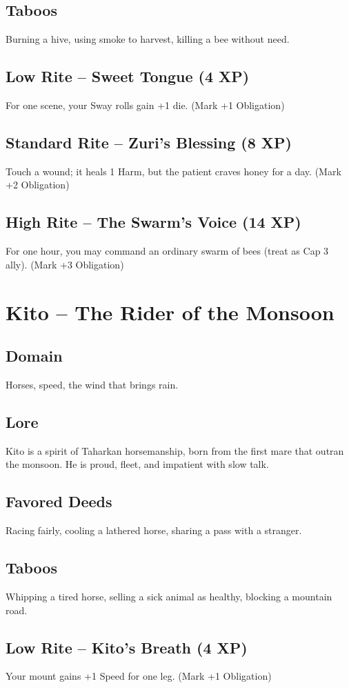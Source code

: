 \documentclass[11pt]{book}
\begin{document}
\subsection*{Taboos}
Burning a hive, using smoke to harvest, killing a bee without need.
\subsection*{Low Rite -- Sweet Tongue (4 XP)}
For one scene, your Sway rolls gain +1 die. (Mark +1 Obligation)
\subsection*{Standard Rite -- Zuri's Blessing (8 XP)}
Touch a wound; it heals 1 Harm, but the patient craves honey for a day. (Mark +2 Obligation)
\subsection*{High Rite -- The Swarm's Voice (14 XP)}
For one hour, you may command an ordinary swarm of bees (treat as Cap 3 ally). (Mark +3 Obligation)

\section{Kito -- The Rider of the Monsoon}
\subsection*{Domain}
Horses, speed, the wind that brings rain.
\subsection*{Lore}
Kito is a spirit of Taharkan horsemanship, born from the first mare that outran the monsoon. He is proud, fleet, and impatient with slow talk.
\subsection*{Favored Deeds}
Racing fairly, cooling a lathered horse, sharing a pass with a stranger.
\subsection*{Taboos}
Whipping a tired horse, selling a sick animal as healthy, blocking a mountain road.
\subsection*{Low Rite -- Kito's Breath (4 XP)}
Your mount gains +1 Speed for one leg. (Mark +1 Obligation)
\end{document}
